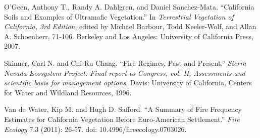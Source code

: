 \begin{hangparas}{.25in}{1}
O’Geen, Anthony T., Randy A. Dahlgren, and Daniel Sanchez-Mata. ``California Soils and Examples of Ultramafic Vegetation.'' In \emph{Terrestrial Vegetation of California, 3rd Edition}, edited by Michael Barbour, Todd Keeler-Wolf, and Allan A. Schoenherr, 71-106. Berkeley and Los Angeles: University of California Press, 2007. 

Skinner, Carl N. and Chi-Ru Chang. ``Fire Regimes, Past and Present.'' \emph{Sierra Nevada Ecosystem Project: Final report to Congress, vol. II, Assessments and scientific basis for management options}. Davis: University of California, Centers for Water and Wildland Resources, 1996.

Van de Water, Kip M. and Hugh D. Safford. ``A Summary of Fire Frequency Estimates for California Vegetation Before Euro-American Settlement.'' \emph{Fire Ecology} 7.3 (2011): 26-57. doi: 10.4996/fireecology.0703026.

\end{hangparas}

